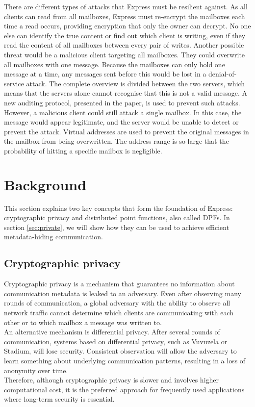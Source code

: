 \documentclass[a4paper]{article}
\begin{document}
There are different types of attacks that Express must be resilient against.
As all clients can read from all mailboxes, Express must re-encrypt the mailboxes each time a read occurs, providing encryption that only the owner can decrypt. No one else can identify the true content or find out which client is writing, even if they read the content of all mailboxes between every pair of writes. Another possible threat would be a malicious client targeting all mailboxes. They could overwrite all mailboxes with one message. Because the mailboxes can only hold one message at a time, any messages sent before this would be lost in a denial-of-service attack. The complete overview is divided between the two servers, which means that the servers alone cannot recognise that this is not a valid message. A new auditing protocol, presented in the paper, is used to prevent such attacks. However, a malicious client could still attack a single mailbox. In this case, the message would appear legitimate, and the server would be unable to detect or prevent the attack. Virtual addresses are used to prevent the original messages in the mailbox from being overwritten. The address range is so large that the probability of hitting a specific mailbox is negligible.

\section{Background}
\label{sec:background}
This section explains two key concepts that form the foundation of Express: cryptographic privacy and distributed point functions, also called DPFs. In section \ref{sec:private}, we will show how they can be used to achieve efficient metadata-hiding communication.

\subsection{Cryptographic privacy}
\label{subsec:first-background}
Cryptographic privacy is a mechanism that guarantees no information about communication metadata is leaked to an adversary. Even after observing many rounds of communication, a global adversary with the ability to observe all network traffic cannot determine which clients are communicating with each other or to which mailbox a message was written to. \\
An alternative mechanism is differential privacy. After several rounds of communication, systems based on differential privacy, such as Vuvuzela or Stadium, will lose security. Consistent observation will allow the adversary to learn something about underlying communication patterns, resulting in a loss of anonymity over time. \\
Therefore, although cryptographic privacy is slower and involves higher computational cost, it is the preferred approach for frequently used applications where long-term security is essential.  
\end{document}
